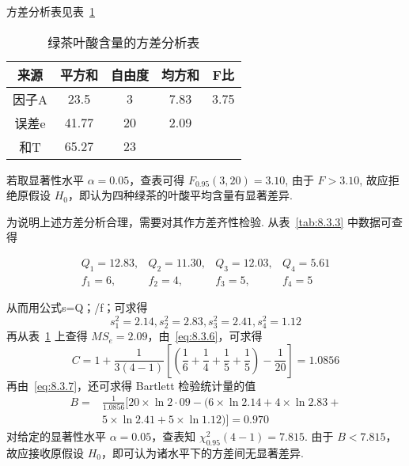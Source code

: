 \begin{example}
方差分析表见表~\ref{tab:8.3.4}

\begin{table}[htbp]
  \centering
  \caption{绿茶叶酸含量的方差分析表}
    \begin{tabular}{ccccc}
    \toprule
    来源    & 平方和   & 自由度   & 均方和   & F比 \\
    \midrule
    因子A   & 23.5  & 3     & 7.83  & 3.75 \\
    误差e   & 41.77 & 20    & 2.09  &  \\
    \midrule
    和T    & 65.27 & 23    &       &  \\
    \bottomrule
    \end{tabular}%
  \label{tab:8.3.4}%
\end{table}%
若取显著性水平 $\alpha=0.05$，查表可得 $F_{0.95}(3,20) = 3.10$, 由于 $F > 3.10$, 故应拒绝原假设 $H_0$，即认为四种绿茶的叶酸平均含量有显著差异.

为说明上述方差分析合理，需要对其作方差齐性检验. 从表~\ref{tab:8.3.3} 中数据可查得

\begin{equation*}
\begin{array}{llll}{Q_{1}=12.83,} & {Q_{2}=11.30,} & {Q_{3}=12.03,} & {Q_{4}=5.61} \\ {f_{1}=6,} & {f_{2}=4,} & {f_{3}=5,} & {f_{4}=5}\end{array}
\end{equation*}

从而用公式s=Q；/f；可求得
\begin{equation*}
  s_{1}^{2}=2.14, s_{2}^{2}=2.83, s_{3}^{2}=2.41, s_{4}^{2}=1.12
\end{equation*}
再从表~\ref{tab:8.3.4} 上查得 $MS_{e}=2.09$，由~\eqref{eq:8.3.6}，可求得
\begin{equation*}
  C=1+\frac{1}{3(4-1)}\left[\left(\frac{1}{6}+\frac{1}{4}+\frac{1}{5}+\frac{1}{5}\right)-\frac{1}{20}\right]=1.0856
\end{equation*}
再由~\eqref{eq:8.3.7}，还可求得 Bartlett 检验统计量的值
\begin{equation*}
\begin{aligned} B=& \frac{1}{1.0856}[20 \times \ln 2 \cdot 09-(6 \times \ln 2.14+4 \times \ln 2.83+\\ & 5 \times \ln 2.41+5 \times \ln 1.12 ) ]=0.970 
\end{aligned}
\end{equation*}
对给定的显著性水平 $\alpha=0.05$，查表知 $\chi^2_{0.95}(4-1)=7.815$. 由于 $B<7.815$，故应接收原假设 $H_0$，即可认为诸水平下的方差间无显著差异.
\end{example}

